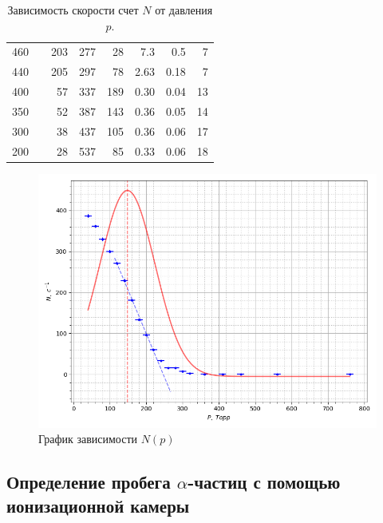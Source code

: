 \documentclass{article}
\begin{document}
\begin{table}[h!]
\begin{tabular}{|r|c|r|r|r|r|r|r|}
460 &                              & 203  & 277 & 28  & 7.3  & 0.5  & 7    \\ \cline{1-1} \cline{3-8} 
440 &                              & 205  & 297 & 78  & 2.63 & 0.18 & 7    \\ \cline{1-1} \cline{3-8} 
400 &                              & 57   & 337 & 189 & 0.30 & 0.04 & 13   \\ \cline{1-1} \cline{3-8} 
350 &                              & 52   & 387 & 143 & 0.36 & 0.05 & 14   \\ \cline{1-1} \cline{3-8} 
300 &                              & 38   & 437 & 105 & 0.36 & 0.06 & 17   \\ \cline{1-1} \cline{3-8} 
200 &                              & 28   & 537 & 85  & 0.33 & 0.06 & 18   \\ \hline
\end{tabular}
\caption{Зависимость скорости счет $N$ от давления $p$.}
\label{tab:my-table}
\end{table}


 
    \begin{figure}[h!]
			\centering
			\includegraphics[width=0.9\linewidth]{5.4.1N(P).png}
			\caption{График зависимости $N(p)$}
    \end{figure}

	\subsection{ Определение пробега $\alpha$-частиц с помощью ионизационной камеры}
	
\end{document}
